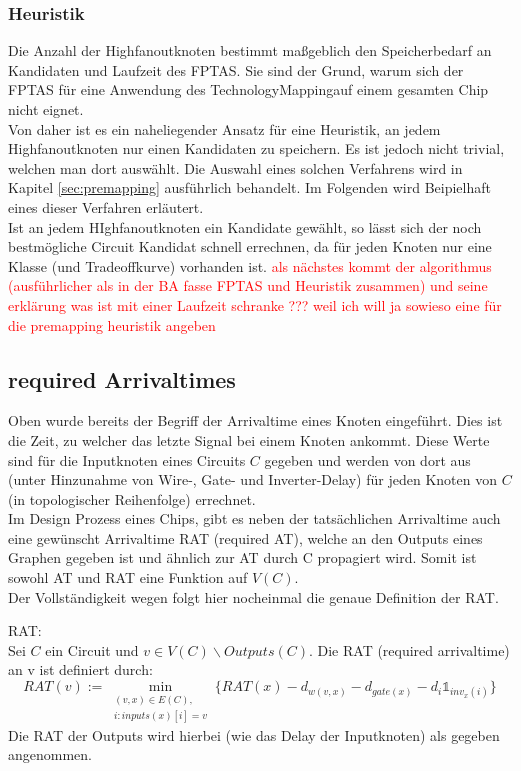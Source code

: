 \documentclass[11pt, a4paper, german]{article}
\newcommand{\TM}{TechnologyMapping}
\begin{document}
\subsubsection{Heuristik}
\label{subsubsec:heuristik}
Die Anzahl der Highfanoutknoten bestimmt maßgeblich den Speicherbedarf an Kandidaten und Laufzeit des FPTAS. Sie sind der Grund, warum sich der FPTAS für eine Anwendung des \TM auf einem gesamten Chip nicht eignet. \\
Von daher ist es ein naheliegender Ansatz für eine Heuristik, an jedem Highfanoutknoten nur einen Kandidaten zu speichern. Es ist jedoch nicht trivial, welchen man dort auswählt. Die Auswahl eines solchen Verfahrens wird in Kapitel \ref{sec:premapping} ausführlich behandelt. Im Folgenden wird Beipielhaft eines dieser Verfahren erläutert. \\
Ist an jedem HIghfanoutknoten ein Kandidate gewählt, so lässt sich der noch bestmögliche Circuit Kandidat schnell errechnen, da für jeden Knoten nur eine Klasse (und Tradeoffkurve) vorhanden ist.
\textcolor{red}{als nächstes kommt der algorithmus (ausführlicher als in der BA fasse FPTAS und Heuristik zusammen) und seine erklärung was ist mit einer Laufzeit schranke ??? weil ich will ja sowieso eine für die premapping heuristik angeben} 

\subsection{required Arrivaltimes}
\label{subsec:rat}
Oben wurde bereits der Begriff der Arrivaltime eines Knoten eingeführt. Dies ist die Zeit, zu welcher das letzte Signal bei einem Knoten ankommt. Diese Werte sind für die Inputknoten eines Circuits $C$ gegeben und werden von dort aus (unter Hinzunahme von Wire-, Gate- und Inverter-Delay) für jeden Knoten von $C$ (in topologischer Reihenfolge) errechnet.\\
Im Design Prozess eines Chips, gibt es neben der tatsächlichen Arrivaltime auch eine  gewünscht Arrivaltime RAT (required AT), welche an den Outputs eines Graphen gegeben ist und ähnlich zur AT durch C propagiert wird. Somit ist sowohl AT und RAT eine Funktion auf $V(C)$. \\
Der Vollständigkeit wegen folgt hier nocheinmal die genaue Definition der RAT.\\

\begin{definition}{RAT:}\\
	Sei $C$ ein Circuit und $v \in V(C)\backslash  Outputs(C)$. Die RAT (required arrivaltime) an v ist definiert durch:
	\[   RAT(v) := \min\limits_{ \substack{(v,x)\in E(C), \\ i: inputs(x)[i] = v }} \{ RAT(x) - d_{w(v,x)} - d_{gate(x)} - d_{i} \mathbb{1}_{inv_x(i)} \}\] 
	Die RAT der Outputs wird hierbei (wie das Delay der Inputknoten) als gegeben angenommen. 
\end{definition}
\end{document}
